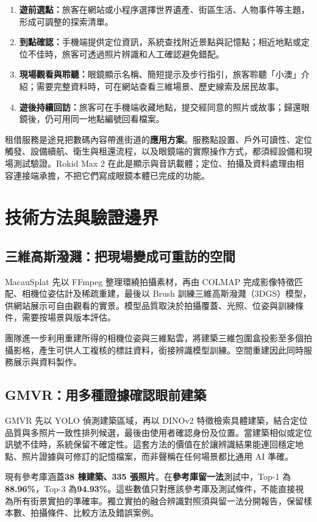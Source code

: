 \documentclass[UTF8,a4paper,11pt]{ctexart}
\begin{document}
\begin{enumerate}[leftmargin=2.3em,itemsep=.45em]
\item \textbf{遊前選點：}旅客在網站或小程序選擇世界遺產、街區生活、人物事件等主題，形成可調整的探索清單。
\item \textbf{到點確認：}手機端提供定位資訊，系統查找附近景點與記憶點；相近地點或定位不佳時，旅客可透過照片辨識和人工確認避免錯配。
\item \textbf{現場觀看與聆聽：}眼鏡顯示名稱、簡短提示及步行指引，旅客聆聽「小澳」介紹；需要完整資料時，可在網站查看三維場景、歷史線索及居民故事。
\item \textbf{遊後持續回訪：}旅客可在手機端收藏地點，提交經同意的照片或故事；歸還眼鏡後，仍可用同一地點編號回看檔案。
\end{enumerate}

租借服務是途見把數碼內容帶進街道的\textbf{應用方案}。服務點設置、戶外可讀性、定位觸發、設備續航、衛生與租還流程，以及眼鏡端的實際操作方式，都須經設備和現場測試驗證。Rokid Max 2 在此是顯示與音訊載體；定位、拍攝及資料處理由相容連接端承擔，不把它們寫成眼鏡本體已完成的功能。

\section{技術方法與驗證邊界}
\subsection{三維高斯潑濺：把現場變成可重訪的空間}
MacauSplat 先以 FFmpeg 整理環繞拍攝素材，再由 COLMAP 完成影像特徵匹配、相機位姿估計及稀疏重建，最後以 Brush 訓練三維高斯潑濺（3DGS）模型，供網站展示可自由觀看的實景。模型品質取決於拍攝覆蓋、光照、位姿與訓練條件，需要按場景與版本評估。

團隊進一步利用重建所得的相機位姿與三維點雲，將建築三維包圍盒投影至多個拍攝影格，產生可供人工複核的標註資料，銜接辨識模型訓練。空間重建因此同時服務展示與資料製作。

\subsection{GMVR：用多種證據確認眼前建築}
GMVR 先以 YOLO 偵測建築區域，再以 DINOv2 特徵檢索具體建築，結合定位品質與多照片一致性排列候選，最後由使用者確認身份及位置。當建築相似或定位訊號不佳時，系統保留不確定性。這套方法的價值在於讓辨識結果能連回穩定地點、照片證據與可修訂的記憶檔案，而非聲稱在任何場景都比通用 AI 準確。

現有參考庫涵蓋\textbf{38 棟建築、335 張照片}。在\textbf{參考庫留一法}測試中，Top-1 為\textbf{88.96\%}，Top-3 為\textbf{94.93\%}。這些數值只對應該參考庫及測試條件，不能直接視為所有街景實拍的準確率。獨立實拍的融合辨識對照須與留一法分開報告，保留樣本數、拍攝條件、比較方法及錯誤案例。
\end{document}

